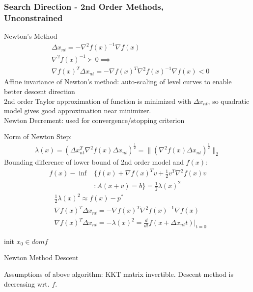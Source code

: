 \documentclass[8pt]{report}
\newcommand{\norm}[1]{\|#1\|}
\begin{document}
\begin{multicols*}{2}
  \subsubsection{Search Direction - 2nd Order Methods,\\ Unconstrained}
  Newton's Method
  \begin{align*}
    &\Delta x_{nt} = - \nabla^2 f(x)^{-1} \nabla f(x)\\
    &\nabla^2 f(x)^{-1} \succ 0 \implies\\
    &\nabla f(x)^T \Delta x_{nt} = - \nabla f(x)^T \nabla^2 f(x)^{-1} \nabla f(x) < 0
  \end{align*}
  Affine invariance of Newton's method: auto-scaling of level curves to enable better descent direction\\
  
  2nd order Taylor approximation of function is minimized with $\Delta x_{nt}$, so quadratic model gives good approximation near minimizer.\\

  Newton Decrement: used for convergence/stopping criterion
  
  Norm of Newton Step:
  \begin{align*}
    \lambda(x) = (\Delta x_{nt}^T \nabla^2 f(x) \Delta x_{nt})^{\frac{1}{2}} = \norm{(\nabla^2 f(x) \Delta x_{nt})^{\frac{1}{2}}}_2
  \end{align*}
  Bounding difference of lower bound of 2nd order model and $f(x)$:
  \begin{align*}
    f(x) - \inf & \{ f(x) + \nabla f(x)^T v + \frac{1}{2} v^T \nabla^2 f(x) v\\
                &: A(x+v) = b \} = \frac{1}{2} \lambda(x)^2
  \end{align*}
  \begin{align*}
    &\frac{1}{2}\lambda(x)^2 \approx f(x) -p^*\\
    &\nabla f(x)^T \Delta x_{nt} = - \nabla f(x)^T \nabla^2 f(x)^{-1} \nabla f(x)\\
    &\nabla f(x)^T \Delta x_{nt} = -\lambda(x)^2 = \frac{d}{dt}f(x+\Delta x_{nt}t)|_{t=0}
  \end{align*}
  
  \begin{algorithm}[H]
    init $x_0 \in dom f$\;
    \caption{Newton Method Descent\label{NewtonMethod}}
  \end{algorithm}
  Assumptions of above algorithm: KKT matrix invertible. Descent method is decreasing wrt. $f$.\\
  

\end{multicols*}
\end{document}

